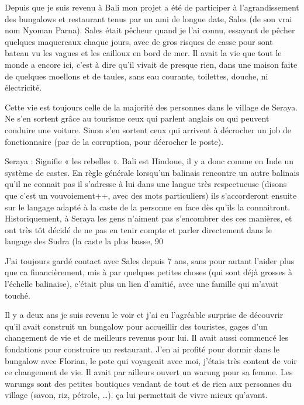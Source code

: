 \begin{multicols}{2}
Depuis que je suis revenu à Bali mon projet a été de participer à l’agrandissement des bungalows et restaurant tenus par un ami de longue date, Sales (de son vrai nom Nyoman Parna). Sales était pêcheur quand je l’ai connu, essayant de pêcher quelques maquereaux chaque jours, avec de gros risques de casse pour sont bateau vu les vagues et les cailloux en bord de mer. Il avait la vie que tout le monde a encore ici, c’est à dire qu’il vivait de presque rien, dans une maison faite de quelques moellons et de taules, sans eau courante, toilettes, douche, ni électricité.

Cette vie est toujours celle de la majorité des personnes dans le village de Seraya. Ne s’en sortent grâce au tourisme ceux qui parlent anglais ou qui peuvent conduire une voiture. Sinon s’en sortent ceux qui arrivent à décrocher un job de fonctionnaire (par de la corruption, pour décrocher le poste).

Seraya : Signifie « les rebelles ». Bali est Hindoue, il y a donc comme en Inde un système de castes. En règle générale lorsqu’un balinais rencontre un autre balinais qu’il ne connait pas il s’adresse à lui dans une langue très respectueuse (disons que c’est un vouvoiement++, avec des mots particuliers) ils s’accorderont ensuite sur le langage adapté à la caste de la personne en face dès qu’ils la connaitront. Historiquement, à Seraya les gens n’aiment pas s’encombrer des ces manières, et ont très tôt décidé de ne pas en tenir compte et parler directement dans le langage des Sudra (la caste la plus basse, 90%

J’ai toujours gardé contact avec Sales depuis 7 ans, sans pour autant l’aider plus que ca financièrement, mis à par quelques petites choses (qui sont déjà grosses à l’échelle balinaise), c’était plus un lien d’amitié, avec une famille qui m’avait touché.

Il y a deux ans je suis revenu le voir et j’ai eu l’agréable surprise de découvrir qu’il avait construit un bungalow pour accueillir des touristes, gages d’un changement de vie et de meilleurs revenus pour lui. Il avait aussi commencé les fondations pour construire un restaurant. J’en ai profité pour dormir dans le bungalow avec Florian, le pote qui voyageait avec moi, j’étais très content de voir ce changement de vie. Il avait par ailleurs ouvert un warung pour sa femme. Les warungs sont des petites boutiques vendant de tout et de rien aux personnes du village (savon, riz, pétrole, …). ça lui permettait de vivre mieux qu’avant.


\end{multicols}
